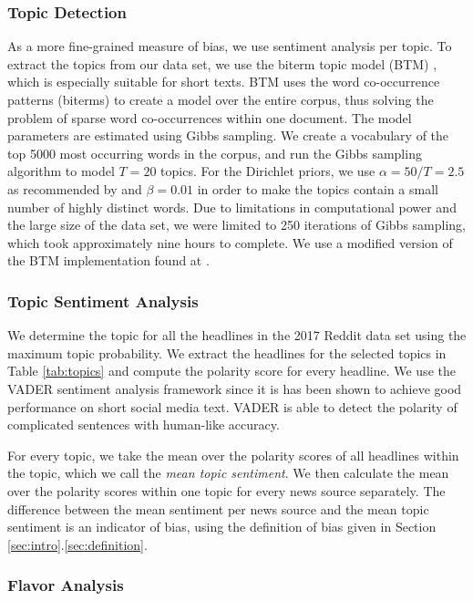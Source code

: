 \documentclass[final]{ieee}
\begin{document}
\subsubsection{Topic Detection}

As a more fine-grained measure of bias, we use sentiment analysis per topic. To extract the topics from our data set, we use the biterm topic model (BTM) \cite{BTM13}, which is especially suitable for short texts. BTM uses the word co-occurrence patterns (biterms) to create a model over the entire corpus, thus solving the problem of sparse word co-occurrences within one document. The model parameters are estimated using Gibbs sampling. We create a vocabulary of the top 5000 most occurring words in the corpus, and run the Gibbs sampling algorithm to model $T = 20$ topics. For the Dirichlet priors, we use $\alpha = 50/T = 2.5$ as recommended by \cite{FST13} and $\beta = 0.01$ in order to make the topics contain a small number of highly distinct words. Due to limitations in computational power and the large size of the data set, we were limited to 250 iterations of Gibbs sampling, which took approximately nine hours to complete. We use a modified version of the BTM implementation found at \cite{BTM15}.

\subsubsection{Topic Sentiment Analysis}\label{sec:topic sent}

We determine the topic for all the headlines in the 2017 Reddit data set using the maximum topic probability. We extract the headlines for the selected topics in Table \ref{tab:topics} and compute the polarity score for every headline. We use the VADER sentiment analysis framework \cite{VAD14} since it is has been shown to achieve good performance on short social media text. VADER is able to detect the polarity of complicated sentences with human-like accuracy.

For every topic, we take the mean over the polarity scores of all headlines within the topic, which we call the \textit{mean topic sentiment}. We then calculate the mean over the polarity scores within one topic for every news source separately. The difference between the mean sentiment per news source and the mean topic sentiment is an indicator of bias, using the definition of bias given in Section \ref{sec:intro}.\ref{sec:definition}.

\subsubsection{Flavor Analysis}\label{sec:flavor}
\end{document}
